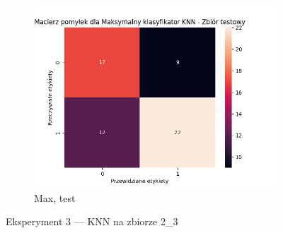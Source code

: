 \documentclass[12pt]{article}
\newcommand*{\subfigwidth}{0.24\textwidth}
\begin{document}
\begin{figure}[H]
\begin{subfigure}[t]{\subfigwidth}
        \includegraphics[width=\linewidth]{img/exp_3/knn/2_3/max/test_matrix.png}
        \caption{Max, test}
    \end{subfigure} 
    
    \caption{Eksperyment 3 --- KNN na zbiorze 2\_3}\label{fig:figure9}
\end{figure}

\clearpage
\end{document}
